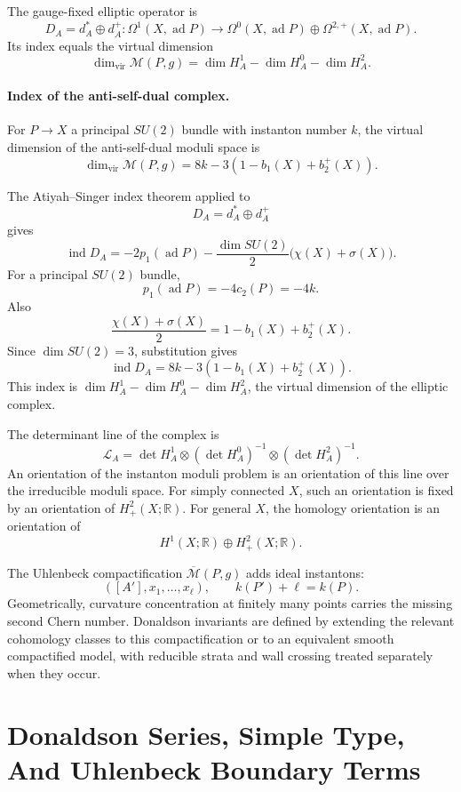 The gauge-fixed elliptic operator is
\[
  D_A=d_A^*\oplus d_A^+:
  \Omega^1(X,\operatorname{ad}P)
  \longrightarrow
  \Omega^0(X,\operatorname{ad}P)\oplus
  \Omega^{2,+}(X,\operatorname{ad}P).
\]
Its index equals the virtual dimension
\[
  \dim_{\mathrm{vir}}\mathcal M(P,g)
  =
  \dim H_A^1-\dim H_A^0-\dim H_A^2 .
\]

\paragraph{Index of the anti-self-dual complex.}
For \(P\to X\) a principal \(SU(2)\) bundle with instanton number \(k\), the
virtual dimension of the anti-self-dual moduli space is
\[
  \dim_{\mathrm{vir}}\mathcal M(P,g)
  =
  8k-3(1-b_1(X)+b_2^+(X)).
\]

The Atiyah--Singer index theorem applied to
\[
  D_A=d_A^*\oplus d_A^+
\]
gives
\[
  \operatorname{ind}D_A
  =
  -2p_1(\operatorname{ad}P)
  -\frac{\dim SU(2)}{2}\bigl(\chi(X)+\sigma(X)\bigr).
\]
For a principal \(SU(2)\) bundle,
\[
  p_1(\operatorname{ad}P)=-4c_2(P)=-4k .
\]
Also
\[
  \frac{\chi(X)+\sigma(X)}{2}
  =
  1-b_1(X)+b_2^+(X).
\]
Since \(\dim SU(2)=3\), substitution gives
\[
  \operatorname{ind}D_A
  =
  8k-3(1-b_1(X)+b_2^+(X)).
\]
This index is \(\dim H_A^1-\dim H_A^0-\dim H_A^2\), the virtual dimension of
the elliptic complex.

The determinant line of the complex is
\[
  \mathcal L_A
  =
  \det H_A^1\otimes(\det H_A^0)^{-1}\otimes(\det H_A^2)^{-1}.
\]
An orientation of the instanton moduli problem is an orientation of this line
over the irreducible moduli space.  For simply connected \(X\), such an
orientation is fixed by an orientation of \(H^2_+(X;\mathbb R)\).  For general
\(X\), the homology orientation is an orientation of
\[
  H^1(X;\mathbb R)\oplus H^2_+(X;\mathbb R).
\]

The Uhlenbeck compactification \(\overline{\mathcal M}(P,g)\) adds ideal
instantons:
\[
  ([A'],x_1,\ldots,x_\ell),
  \qquad
  k(P')+\ell=k(P).
\]
Geometrically, curvature concentration at finitely many points carries the
missing second Chern number.  Donaldson invariants are defined by extending
the relevant cohomology classes to this compactification or to an equivalent
smooth compactified model, with reducible strata and wall crossing treated
separately when they occur.

\section{Donaldson Series, Simple Type, And Uhlenbeck Boundary Terms}

